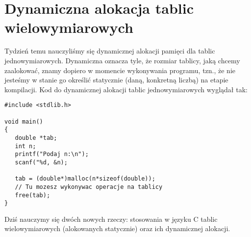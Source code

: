 \documentclass{instrukcja}
\begin{document}
\author{B. Górecki}
\materialtitle

\section*{Dynamiczna alokacja tablic wielowymiarowych}
Tydzień temu nauczyliśmy się dynamicznej alokacji pamięci dla tablic jednowymiarowych. Dynamiczna oznacza tyle, że rozmiar tablicy, jaką chcemy zaalokować, znamy dopiero w momencie wykonywania programu, tzn., że nie jesteśmy w stanie go określić statycznie (daną, konkretną liczbą) na etapie kompilacji. Kod do dynamicznej alokacji tablic jednowymiarowych wyglądał tak:
\begin{verbatim}
#include <stdlib.h>

void main()
{
   double *tab;
   int n;
   printf("Podaj n:\n");
   scanf("%d, &n);

   tab = (double*)malloc(n*sizeof(double));
   // Tu mozesz wykonywac operacje na tablicy
   free(tab);
}
\end{verbatim}
Dziś nauczymy się dwóch nowych rzeczy: stosowania w języku C tablic wielowymiarowych (alokowanych statycznie) oraz ich dynamicznej alokacji.
\end{document}
